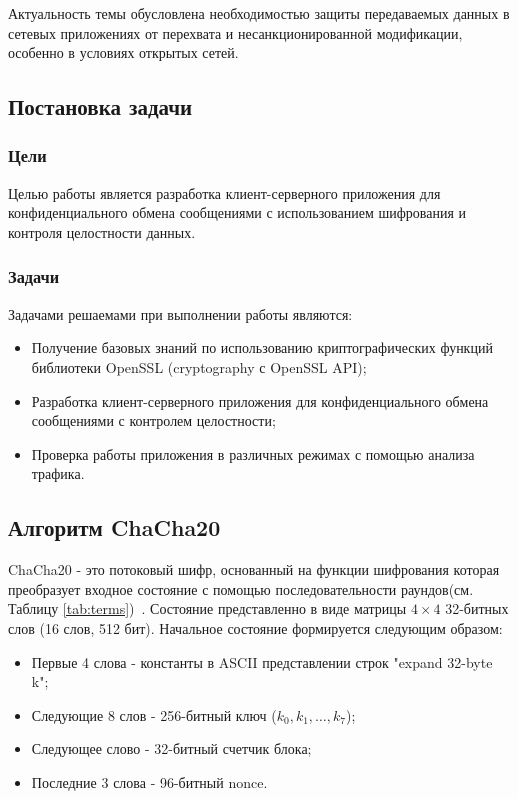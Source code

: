 \documentclass[areasetadvanced]{scrartcl}
\begin{document}
Актуальность темы обусловлена необходимостью защиты передаваемых данных в сетевых приложениях от перехвата и несанкционированной модификации, особенно в условиях открытых сетей.
\subsection{Постановка задачи}
\subsubsection{Цели}
Целью работы является разработка клиент-серверного приложения для конфиденциального обмена
сообщениями с использованием шифрования и контроля целостности данных.
\subsubsection{Задачи}
Задачами решаемами при выполнении работы являются:
\begin{itemize}
    \item Получение базовых знаний по использованию криптографических функций библиотеки OpenSSL (cryptography с OpenSSL API);
    \item Разработка клиент-серверного приложения для конфиденциального обмена сообщениями с контролем целостности;
    \item Проверка работы приложения в различных режимах с помощью анализа трафика.
\end{itemize}

\subsection{Алгоритм ChaCha20}
ChaCha20 - это потоковый шифр, основанный на функции шифрования которая преобразует входное состояние с помощью последовательности раундов(см. Таблицу \ref{tab:terms})~\cite{chacha20}.
Состояние представленно в виде матрицы $4 \times 4$ 32-битных слов (16 слов, 512 бит). Начальное состояние формируется следующим образом:
\begin{itemize}
    \item Первые 4 слова - константы в ASCII представлении строк "expand 32-byte k";
    \item Следующие 8 слов - 256-битный ключ ($k_0, k_1, \dots, k_7$);
    \item Следующее слово - 32-битный счетчик блока; 
    \item Последние 3 слова - 96-битный nonce.
\end{itemize}
\end{document}
